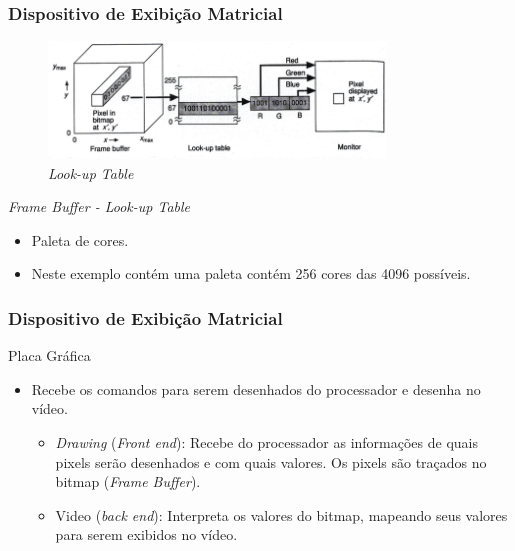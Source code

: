 \documentclass{beamer}
\begin{document}
\begin{frame}
\frametitle{Dispositivo de Exibição Matricial}

	\begin{figure}[!h]
		\begin{center}
			\includegraphics[width=0.8\textwidth]{Figures/lookuptable}
			\caption{\textit{Look-up Table }}
		\end{center}
	\end{figure}
	
	\begin{block}{\textit{Frame Buffer - Look-up Table}}
		\begin{itemize}
			\item Paleta de cores.
			\item Neste exemplo contém uma paleta contém 256 cores das 4096 possíveis.
		\end{itemize}
	\end{block}


\end{frame}



\begin{frame}
\frametitle{Dispositivo de Exibição Matricial}

	\begin{block}{Placa Gráfica}
		\begin{itemize}
			\item Recebe os comandos para serem desenhados do processador e desenha no vídeo.
			\begin{itemize}
				\item \textit{Drawing} (\textit{Front end}): Recebe do processador as informações de quais pixels serão desenhados e com quais valores. Os pixels são traçados no bitmap (\textit{Frame Buffer}).
				\item Video (\textit{back end}): Interpreta os valores do bitmap, mapeando seus valores para serem exibidos no vídeo.
			\end{itemize}
		\end{itemize}
	\end{block}


\end{frame}
\end{document}

